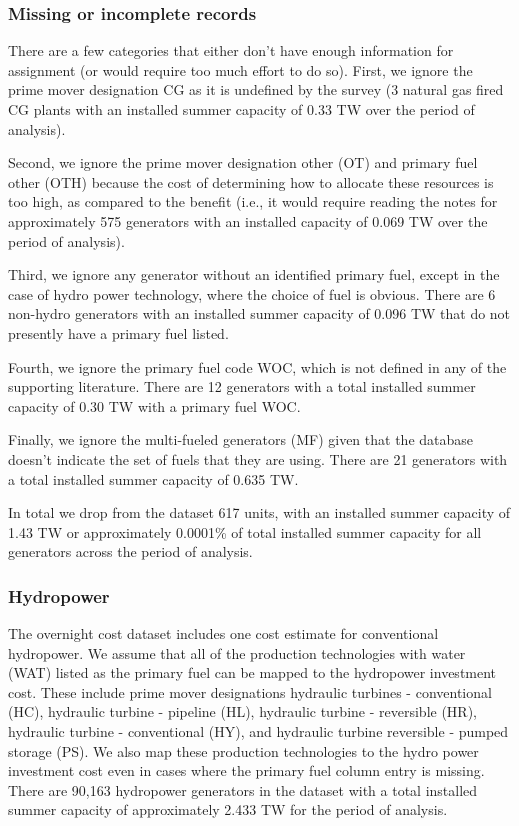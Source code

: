 \documentclass[10pt]{report}
\begin{document}
\subsubsection{Missing or incomplete records}
There are a few categories that either don't have enough information for assignment (or would require too much effort to do so). 
First, we ignore the prime mover designation CG as it is undefined by the survey (3 natural gas fired CG plants with an installed summer capacity of 0.33 TW over the period of analysis).

Second, we ignore the prime mover designation other (OT) and primary fuel other (OTH) because the cost of determining how to allocate these resources is too high, as compared to the benefit (i.e., it would require reading the notes for approximately 575 generators with an installed capacity of 0.069 TW over the period of analysis).

Third, we ignore any generator without an identified primary fuel, except in the case of hydro power technology, where the choice of fuel is obvious.
There are 6 non-hydro generators with an installed summer capacity of 0.096 TW that do not presently have a primary fuel listed.

Fourth, we ignore the primary fuel code WOC, which is not defined in any of the supporting literature. 
There are 12 generators with a total installed summer capacity of 0.30 TW with a primary fuel WOC.   

Finally, we ignore the multi-fueled generators (MF) given that the database doesn't indicate the set of fuels that they are using.
There are 21 generators with a total installed summer capacity of 0.635 TW. 

In total we drop from the dataset 617 units, with an installed summer capacity of 1.43 TW or approximately 0.0001\% of total installed summer capacity for all generators across the period of analysis.

\subsubsection{Hydropower}
The overnight cost dataset includes one cost estimate for conventional hydropower.
We assume that all of the production technologies with water (WAT) listed as the primary fuel can be mapped to the hydropower investment cost.
These include prime mover designations hydraulic turbines - conventional (HC), hydraulic turbine - pipeline (HL), hydraulic turbine - reversible (HR), hydraulic turbine - conventional (HY), and hydraulic turbine reversible - pumped storage (PS). 
We also map these production technologies to the hydro power investment cost even in cases where the primary fuel column entry is missing. 
There are 90,163 hydropower generators in the dataset with a total installed summer capacity of approximately 2.433 TW for the period of analysis. 
\end{document}
